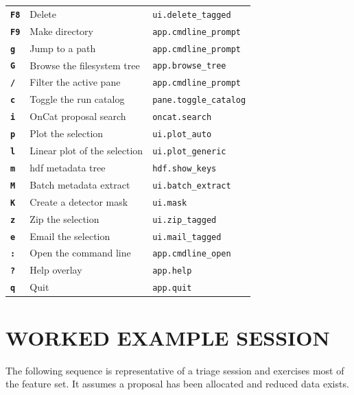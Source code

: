 \documentclass[tm]{ornltm}
\newcommand{\key}[1]{\textbf{\texttt{#1}}}
\begin{document}
\begin{small}
\begin{longtable}{p{} p{} p{}}
  \key{F8} & Delete & \texttt{ui.delete\_tagged} \\
  \key{F9} & Make directory & \texttt{app.cmdline\_prompt} \\
  \key{g} & Jump to a path & \texttt{app.cmdline\_prompt} \\
  \key{G} & Browse the filesystem tree & \texttt{app.browse\_tree} \\
  \key{/} & Filter the active pane & \texttt{app.cmdline\_prompt} \\
  \key{c} & Toggle the run catalog & \texttt{pane.toggle\_catalog} \\
  \key{i} & OnCat proposal search & \texttt{oncat.search} \\
  \key{p} & Plot the selection & \texttt{ui.plot\_auto} \\
  \key{l} & Linear plot of the selection & \texttt{ui.plot\_generic} \\
  \key{m} & \Ac{hdf} metadata tree & \texttt{hdf.show\_keys} \\
  \key{M} & Batch metadata extract & \texttt{ui.batch\_extract} \\
  \key{K} & Create a detector mask & \texttt{ui.mask} \\
  \key{z} & Zip the selection & \texttt{ui.zip\_tagged} \\
  \key{e} & Email the selection & \texttt{ui.mail\_tagged} \\
  \key{:} & Open the command line & \texttt{app.cmdline\_open} \\
  \key{?} & Help overlay & \texttt{app.help} \\
  \key{q} & Quit & \texttt{app.quit} \\
\end{longtable}
\end{small}

\section{WORKED EXAMPLE SESSION}
\label{sec:appsession}

The following sequence is representative of a triage session and exercises most
of the feature set. It assumes a proposal has been allocated and reduced data
exists.
\end{document}
